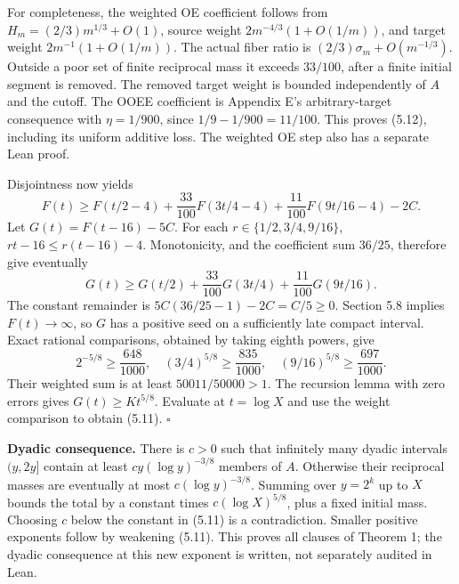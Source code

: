 \documentclass[11pt,a4paper]{article}
\begin{document}
For completeness, the weighted OE coefficient follows from
\(H_m=(2/3)m^{1/3}+O(1)\), source weight \(2m^{-4/3}(1+O(1/m))\), and
target weight \(2m^{-1}(1+O(1/m))\). The actual fiber ratio is
\((2/3)\sigma_m+O(m^{-1/3})\). Outside a poor set of finite reciprocal
mass it exceeds \(33/100\), after a finite initial segment is removed.
The removed target weight is bounded independently of \(A\) and the
cutoff. The OOEE coefficient is Appendix E's arbitrary-target
consequence with \(\eta=1/900\), since \(1/9-1/900=11/100\). This proves
(5.12), including its uniform additive loss. The weighted OE step also
has a separate Lean proof.

Disjointness now yields \[
F(t)\ge F(t/2-4)+\frac{33}{100}F(3t/4-4)
                  +\frac{11}{100}F(9t/16-4)-2C.
\] Let \(G(t)=F(t-16)-5C\). For each \(r\in\{1/2,3/4,9/16\}\),
\(rt-16\le r(t-16)-4\). Monotonicity, and the coefficient sum \(36/25\),
therefore give eventually \[
G(t)\ge G(t/2)+\frac{33}{100}G(3t/4)
                  +\frac{11}{100}G(9t/16).
\tag{5.13}
\] The constant remainder is \(5C(36/25-1)-2C=C/5\ge0\). Section 5.8
implies \(F(t)\to\infty\), so \(G\) has a positive seed on a
sufficiently late compact interval. Exact rational comparisons, obtained
by taking eighth powers, give \[
2^{-5/8}\ge\frac{648}{1000},\quad
(3/4)^{5/8}\ge\frac{835}{1000},\quad
(9/16)^{5/8}\ge\frac{697}{1000}.
\] Their weighted sum is at least \(50011/50000>1\). The recursion lemma
with zero errors gives \(G(t)\ge Kt^{5/8}\). Evaluate at \(t=\log X\)
and use the weight comparison to obtain (5.11). \(\square\)

\textbf{Dyadic consequence.} There is \(c>0\) such that infinitely many
dyadic intervals \((y,2y]\) contain at least \(cy(\log y)^{-3/8}\)
members of \(A\). Otherwise their reciprocal masses are eventually at
most \(c(\log y)^{-3/8}\). Summing over \(y=2^k\) up to \(X\) bounds the
total by a constant times \(c(\log X)^{5/8}\), plus a fixed initial
mass. Choosing \(c\) below the constant in (5.11) is a contradiction.
Smaller positive exponents follow by weakening (5.11). This proves all
clauses of Theorem 1; the dyadic consequence at this new exponent is
written, not separately audited in Lean.
\end{document}
